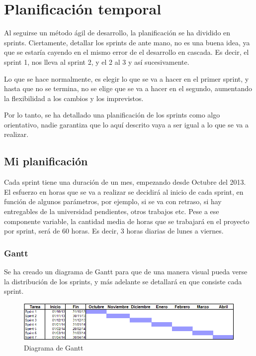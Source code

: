 \section{Planificaci\'{o}n temporal}
Al seguirse un m\'etodo \'agil de desarrollo, la planificaci\'on se ha
dividido en sprints. Ciertamente, detallar los sprints de ante mano,
no es una buena idea, ya que se estar\'ia cayendo en el mismo error de el desarrollo
en cascada. Es decir, el sprint 1, nos lleva al sprint 2, y el 2 al 3 y as\'i sucesivamente.

Lo que se hace normalmente, es elegir lo que se va a hacer en el primer sprint, y hasta
que no se termina, no se elige que se va a hacer en el segundo, aumentando la flexibilidad a 
los cambios y los imprevistos.

Por lo tanto, se ha detallado una planificaci\'on de los sprints como algo orientativo,
nadie garantiza que lo aqu\'i descrito vaya a ser igual a lo que se va a realizar.

\subsection{Mi planificaci\'{o}n}
Cada sprint tiene una duraci\'{o}n de un mes, empezando desde Octubre del 2013. 
El esfuerzo en horas que se va a 
realizar se decidir\'a al inicio de cada sprint, en funci\'on de algunos par\'ametros, por ejemplo, si se va con retraso,
si hay entregables de la universidad pendientes, otros trabajos etc. Pese a ese componente variable, la cantidad
media de horas que se trabajar\'a en el proyecto por sprint, ser\'a de 60 horas. Es decir, 3 horas diarias de lunes a viernes.

\subsubsection{Gantt}
Se ha creado un diagrama de Gantt para que de una manera visual pueda
verse la distribuci\'on de los sprints, y m\'as adelante se detallar\'a
en que consiste cada sprint.

\begin{figure}[h]
\centering
\includegraphics[width=0.9\linewidth]{./Figures/Gantt.PNG}
\caption[Diagrama de Gantt]{Diagrama de Gantt}
\label{fig:Gantt}
\end{figure}

